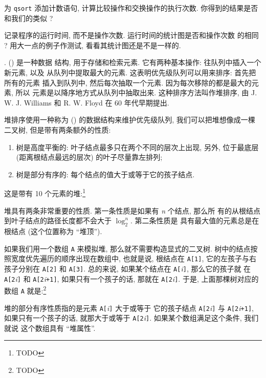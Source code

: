\begin{exercise}
    为 \texttt{qsort} 添加计数语句, 计算比较操作和交换操作的执行次数.
    你得到的结果是否和我们的类似 ?
\end{exercise}

\begin{exercise}
    记录程序的运行时间, 而不是操作次数. 运行时间的统计图是否和操作次数
    的相同 ? 用大一点的例子作测试, 看看其统计图还是不是一样的.
\end{exercise}

.  () 是一种数据
结构, 用于存储和检索元素. 它有两种基本操作: 往队列中插入一个新元素, 以及 
从队列中提取最大的元素. 这表明优先级队列可以用来排序: 首先把所有的元素
插入到队列中, 然后每次抽取一个元素. 因为每次移除的都是最大的元素, 所以 
元素是以降序地方式从队列中抽取出来. 这种排序方法叫作堆排序, 由
J. W. J. Williams 和 R. W. Floyd 在 60 年代早期提出.

堆排序使用一种称为  () 的数据结构来维护优先级队列,
我们可以把堆想像成一棵二叉树, 但是带有两条额外的性质:
\begin{enumerate}
    \item 树是高度平衡的: 叶子结点最多只在两个不同的层次上出现, 另外,
        位于最底层 (距离根结点最远的层次) 的叶子尽量靠左排列;
    \item 树是部分有序的: 每个结点的值大于或等于它的孩子结点.
\end{enumerate}
这是带有 10 个元素的堆:\footnote{TODO}

堆具有两条非常重要的性质. 第一条性质是如果有 \textit{n} 个结点, 那么所
有的从根结点到叶子结点的路径长度都不会大于 $\log_2^n$. 第二条性质是
具有最大值的元素总是在根结点 (这个位置称为 ``堆顶'').

如果我们用一个数组 \texttt{A} 来模拟堆, 那么就不需要构造显式的二叉树.
树中的结点按照宽度优先遍历的顺序出现在数组中, 也就是说, 根结点在 
\texttt{A[1]}, 它的左孩子与右孩子分别在 \texttt{A[2]} 和 \texttt{A[3]}.
总的来说, 如果某个结点在 \texttt{A[}\textit{i}\texttt{]}, 那么它的孩子就
在 \texttt{A[2}\textit{i}\texttt{]} 和 \texttt{A[2}\textit{i}\texttt{+1]},
如果只有一个孩子的话, 那就在 \texttt{A[2}\textit{i}\texttt{]}.
于是, 上面那棵树对应的数组 \texttt{A} 就是:\footnote{TODO}

堆的部分有序性质指的是元素 \texttt{A[}\textit{i}\texttt{]} 大于或等于
它的孩子结点 \texttt{A[2}\textit{i}\texttt{]} 与
\texttt{A[2}\textit{i}\texttt{+1]}, 如果只有一个孩子的话, 就那大于或等于
\texttt{A[2}\textit{i}\texttt{]}. 如果某个数组满足这个条件, 我们就说
这个数组具有 ``堆属性''.

